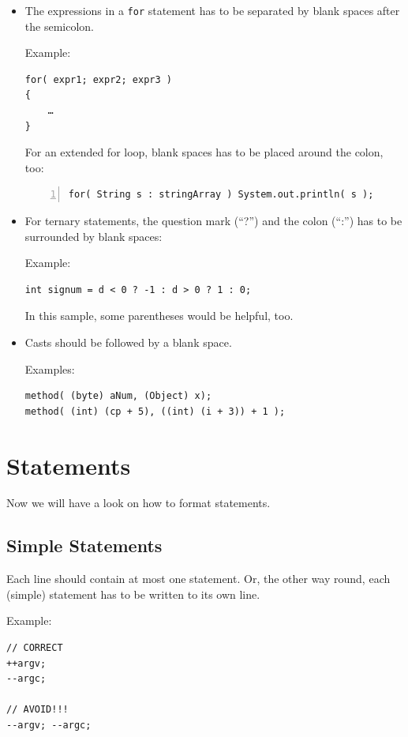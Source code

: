 \documentclass[12pt,a4paper,titlepage, parskip=half, headsepline, footsepline, cleardoubleplain]{scrbook}
\begin{document}
\begin{itemize}
{\begin{lstlisting}[numbers=left]
while( d-- > s++ )
{
    ++n;
}

printSize( "size is " + foo + "\n" );
\end{lstlisting}}
\item{The expressions in a \lstinline|for| statement has to be separated by blank spaces after the semicolon.

Example:
\begin{lstlisting}
for( expr1; expr2; expr3 )
{
    …
}
\end{lstlisting}

For an extended for loop, blank spaces has to be placed around the colon, too:
\begin{lstlisting}[numbers=left]
for( String s : stringArray ) System.out.println( s );
\end{lstlisting}}
\item{For ternary statements, the question mark (“?”) and the colon (“:”) has to be surrounded by blank spaces:

Example:
\begin{lstlisting}
int signum = d < 0 ? -1 : d > 0 ? 1 : 0;
\end{lstlisting}

In this sample, some parentheses would be helpful, too.}
\item{Casts should be followed by a blank space. 

Examples:
\begin{lstlisting}
method( (byte) aNum, (Object) x);
method( (int) (cp + 5), ((int) (i + 3)) + 1 );
\end{lstlisting}}
\end{itemize}

\section{Statements}
Now we will have a look on how to format statements.

\subsection{Simple Statements}
Each line should contain at most one statement. Or, the other way round, each (simple) statement has to be written to its own line.

Example:
\begin{lstlisting}
// CORRECT
++argv;
--argc;

// AVOID!!!
--argv; --argc;
\end{lstlisting}
\end{document}
